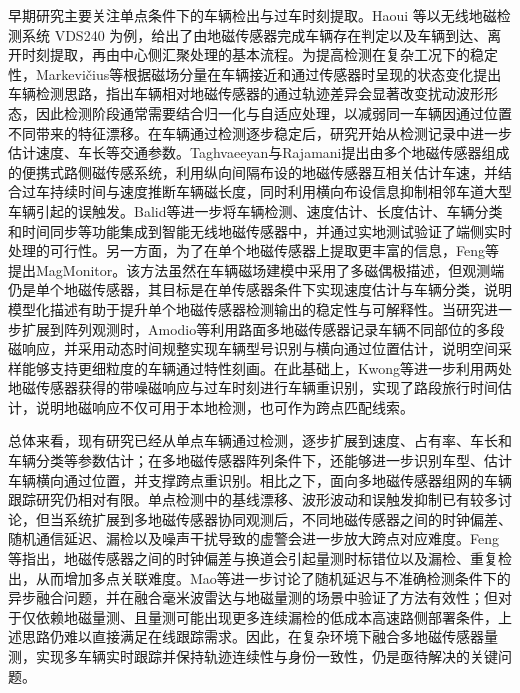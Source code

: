 \documentclass{xdupgthesis}
\begin{document}
早期研究主要关注单点条件下的车辆检出与过车时刻提取。Haoui 等以无线地磁检测系统 VDS240 为例，给出了由地磁传感器完成车辆存在判定以及车辆到达、离开时刻提取，再由中心侧汇聚处理的基本流程\cite{haoui2008wirelessmagnetic}。为提高检测在复杂工况下的稳定性，Markevičius等根据磁场分量在车辆接近和通过传感器时呈现的状态变化提出车辆检测思路，指出车辆相对地磁传感器的通过轨迹差异会显著改变扰动波形形态，因此检测阶段通常需要结合归一化与自适应处理，以减弱同一车辆因通过位置不同带来的特征漂移\cite{markevicius2016dynamic}。在车辆通过检测逐步稳定后，研究开始从检测记录中进一步估计速度、车长等交通参数。Taghvaeeyan与Rajamani提出由多个地磁传感器组成的便携式路侧磁传感系统，利用纵向间隔布设的地磁传感器互相关估计车速，并结合过车持续时间与速度推断车辆磁长度，同时利用横向布设信息抑制相邻车道大型车辆引起的误触发\cite{taghvaeeyan2014portable}。Balid等进一步将车辆检测、速度估计、长度估计、车辆分类和时间同步等功能集成到智能无线地磁传感器中，并通过实地测试验证了端侧实时处理的可行性\cite{balid2018intelligent}。另一方面，为了在单个地磁传感器上提取更丰富的信息，Feng等提出MagMonitor。该方法虽然在车辆磁场建模中采用了多磁偶极描述，但观测端仍是单个地磁传感器，其目标是在单传感器条件下实现速度估计与车辆分类，说明模型化描述有助于提升单个地磁传感器检测输出的稳定性与可解释性\cite{feng2022magmonitor}。当研究进一步扩展到阵列观测时，Amodio等利用路面多地磁传感器记录车辆不同部位的多段磁响应，并采用动态时间规整实现车辆型号识别与横向通过位置估计，说明空间采样能够支持更细粒度的车辆通过特性刻画\cite{amodio2021vehiclemodel}。在此基础上，Kwong等进一步利用两处地磁传感器获得的带噪磁响应与过车时刻进行车辆重识别，实现了路段旅行时间估计，说明地磁响应不仅可用于本地检测，也可作为跨点匹配线索\cite{kwong2009arterialtravel}。

总体来看，现有研究已经从单点车辆通过检测，逐步扩展到速度、占有率、车长和车辆分类等参数估计；在多地磁传感器阵列条件下，还能够进一步识别车型、估计车辆横向通过位置，并支撑跨点重识别。相比之下，面向多地磁传感器组网的车辆跟踪研究仍相对有限。单点检测中的基线漂移、波形波动和误触发抑制已有较多讨论，但当系统扩展到多地磁传感器协同观测后，不同地磁传感器之间的时钟偏差、随机通信延迟、漏检以及噪声干扰导致的虚警会进一步放大跨点对应难度。Feng等指出，地磁传感器之间的时钟偏差与换道会引起量测时标错位以及漏检、重复检出，从而增加多点关联难度\cite{feng2021magneticdataassociation}。Mao等进一步讨论了随机延迟与不准确检测条件下的异步融合问题，并在融合毫米波雷达与地磁量测的场景中验证了方法有效性；但对于仅依赖地磁量测、且量测可能出现更多连续漏检的低成本高速路侧部署条件，上述思路仍难以直接满足在线跟踪需求\cite{mao2025asynchronousfusion}。因此，在复杂环境下融合多地磁传感器量测，实现多车辆实时跟踪并保持轨迹连续性与身份一致性，仍是亟待解决的关键问题。
\end{document}
